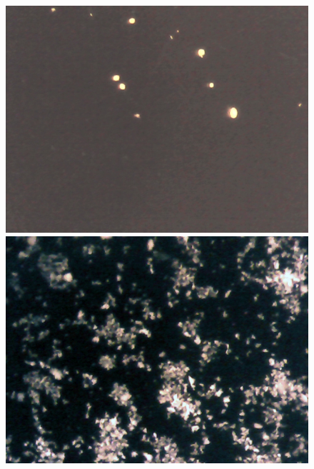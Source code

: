\begin{figure}[htbp] \centering
\begin{minipage}[b]{0.3\textwidth} \centering
\includegraphics[width=1.00\textwidth]{billeder/software/1.jpg} %
\end{minipage} \hfill
\begin{minipage}[b]{0.3\textwidth} \centering
\includegraphics[width=1.00\textwidth]{billeder/software/2.jpg} %
\end{minipage} 
\hfill
\begin{minipage}[b]{0.3\textwidth} \centering

\end{minipage}
\end{figure}
